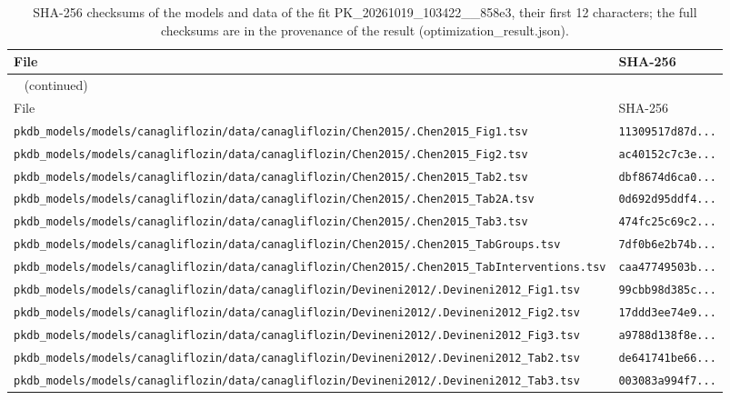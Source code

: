 \begin{longtable}{ll}
\caption{SHA-256 checksums of the models and data of the fit PK\_20261019\_103422\_\_858e3, their first 12 characters; the full checksums are in the provenance of the result (optimization\_result.json).}\label{tab:checksums:PK_20261019_103422__858e3} \\
\toprule
File & SHA-256 \\
\midrule
\endfirsthead
\multicolumn{2}{l}{\small\tablename~\thetable{} (continued)} \\
\toprule
File & SHA-256 \\
\midrule
\endhead
\bottomrule
\endlastfoot
\texttt{pkdb\_models/models/canagliflozin/data/canagliflozin/Chen2015/.Chen2015\_Fig1.tsv} & \texttt{11309517d87d...} \\
\texttt{pkdb\_models/models/canagliflozin/data/canagliflozin/Chen2015/.Chen2015\_Fig2.tsv} & \texttt{ac40152c7c3e...} \\
\texttt{pkdb\_models/models/canagliflozin/data/canagliflozin/Chen2015/.Chen2015\_Tab2.tsv} & \texttt{dbf8674d6ca0...} \\
\texttt{pkdb\_models/models/canagliflozin/data/canagliflozin/Chen2015/.Chen2015\_Tab2A.tsv} & \texttt{0d692d95ddf4...} \\
\texttt{pkdb\_models/models/canagliflozin/data/canagliflozin/Chen2015/.Chen2015\_Tab3.tsv} & \texttt{474fc25c69c2...} \\
\texttt{pkdb\_models/models/canagliflozin/data/canagliflozin/Chen2015/.Chen2015\_TabGroups.tsv} & \texttt{7df0b6e2b74b...} \\
\texttt{pkdb\_models/models/canagliflozin/data/canagliflozin/Chen2015/.Chen2015\_TabInterventions.tsv} & \texttt{caa47749503b...} \\
\texttt{pkdb\_models/models/canagliflozin/data/canagliflozin/Devineni2012/.Devineni2012\_Fig1.tsv} & \texttt{99cbb98d385c...} \\
\texttt{pkdb\_models/models/canagliflozin/data/canagliflozin/Devineni2012/.Devineni2012\_Fig2.tsv} & \texttt{17ddd3ee74e9...} \\
\texttt{pkdb\_models/models/canagliflozin/data/canagliflozin/Devineni2012/.Devineni2012\_Fig3.tsv} & \texttt{a9788d138f8e...} \\
\texttt{pkdb\_models/models/canagliflozin/data/canagliflozin/Devineni2012/.Devineni2012\_Tab2.tsv} & \texttt{de641741be66...} \\
\texttt{pkdb\_models/models/canagliflozin/data/canagliflozin/Devineni2012/.Devineni2012\_Tab3.tsv} & \texttt{003083a994f7...} \\

\end{longtable}
